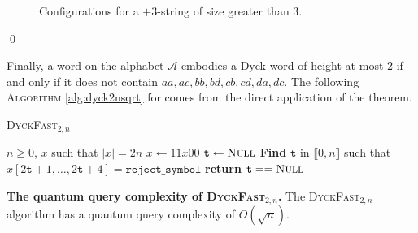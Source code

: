 \begin{tproof}
\begin{figure}[h!]
\begin{minipage}{.60\textwidth}
            \caption{Configurations for a $+3$-string of size greater than 3.}
            \label{fig:p3string2piece}
        \end{minipage}
    \end{figure}

    \qed
\end{tproof}
Finally, a word on the alphabet $\mathcal{A}$ embodies a Dyck word of
height at most 2 if and only if it does not contain $aa, ac, bb, bd, cb, cd, da, dc$.
The following \textsc{Algorithm} \autoref{alg:dyck2nsqrt} for 
comes from the direct application of the theorem.


\begin{algorithm}
    \caption{\textsc{DyckFast}$_{2,n}$}\label{alg:dyck2nsqrt}
    \begin{algorithmic}
        \Require $n \geq 0$, $x$ such that  $|x| = 2n$
        \State $x \gets 11x00$
        \State $\texttt{t} \gets \textsc{Null}$
        \State \textbf{Find} $\texttt{t}$ in $\llbracket0, n\rrbracket$ such that \\
        \hspace*{1cm} $x[2\texttt{t}+1, \ldots, 2\texttt{t}+4] = \texttt{reject\_symbol}$
        \EndIf
        \EndFor
        \State \textbf{return} $\texttt{t} == \textsc{Null}$

    \end{algorithmic}
\end{algorithm}

\begin{theorem}{\textbf{The quantum query complexity of \textsc{DyckFast}$_{2,n}$.}}
    The \textsc{DyckFast}$_{2,n}$ algorithm has a quantum query complexity of $O\left(\sqrt{n}\right)$.
\end{theorem}

